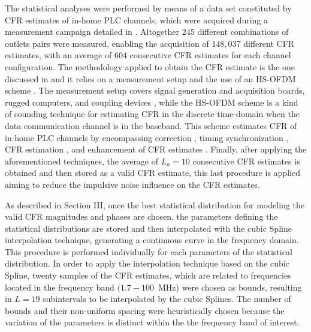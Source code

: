 \documentclass[journal]{IEEEtran}
\begin{document}
The statistical analyses were performed by means of a data set constituted by \ac{CFR} estimates of in-home \ac{PLC} channels, which were acquired during a measurement campaign detailed in \cite{Thiago:Characterization}. Altogether $245$ different combinations of outlets pairs were measured, enabling the acquisition of $148,037$ different \ac{CFR} estimates, with an average of $604$ consecutive \ac{CFR} estimates for each channel configuration. The methodology applied to obtain the \ac{CFR} estimate is the one discussed in \cite{Thiago:FR} and it relies on a measurement setup and the use of an \ac{HS-OFDM} scheme \cite{HSOFDM,Picorone}. The measurement setup covers signal generation and acquisition boards, rugged computers, and coupling devices \cite{Luis:AI}, while the \ac{HS-OFDM} scheme is a kind of sounding technique for estimating \ac{CFR} in the discrete time-domain when the data communication channel is in the baseband. This scheme estimates \ac{CFR} of in-home \ac{PLC} channels by encompassing correction \cite{Gardner:Interpolation}, timing synchronization \cite{Hanzo:OFDMSync}, \ac{CFR} estimation \cite{Thiago:FR}, and enhancement of \ac{CFR} estimates \cite{Cardoso:CEzeropad,Ouzzif:CP}. Finally, after applying the aforementioned techniques, the average of $L_a=10$ consecutive \ac{CFR} estimates is obtained and then stored as a valid \ac{CFR} estimate, this last procedure is applied aiming to reduce the impulsive noise influence on the \ac{CFR} estimates.

As described in Section III, once the best statistical distribution for modeling the valid \ac{CFR} magnitudes and phases are chosen, the parameters defining the statistical distributions are stored and then interpolated with the cubic Spline interpolation technique, generating a continuous curve in the frequency domain. This procedure is performed individually for each parameters of the statistical distribution. In order to apply the interpolation technique based on  the cubic Spline, twenty samples of the \ac{CFR} estimates, which are related to frequencies located in the frequency band $(1.7-100$~MHz) were chosen as bounds, resulting in $L=19$ subintervals to be interpolated by the cubic Splines. The number of bounds and their non-uniform spacing were heuristically chosen because the variation of the parameters is distinct within the the frequency band of interest. 
\end{document}
